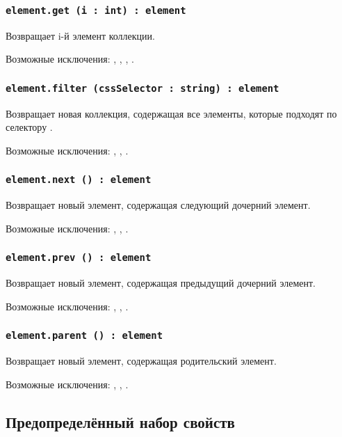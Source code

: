 \subsubsection{\lstinline|element.get (i : int) : element|}

Возвращает i-й элемент коллекции.

Возможные исключения: , , , .

\subsubsection{\lstinline|element.filter (cssSelector : string) : element|}

Возвращает новая коллекция, содержащая все элементы, которые подходят по селектору .

Возможные исключения: , , .
\subsubsection{\lstinline|element.next () : element|}

Возвращает новый элемент, содержащая следующий дочерний элемент.

Возможные исключения: , , .

\subsubsection{\lstinline|element.prev () : element|}

Возвращает новый элемент, содержащая предыдущий дочерний элемент.

Возможные исключения: , , .

\subsubsection{\lstinline|element.parent () : element|}

Возвращает новый элемент, содержащая родительский элемент.

Возможные исключения: , , .

\subsection{Предопределённый набор свойств}
\label{elements:predefined:properties}

